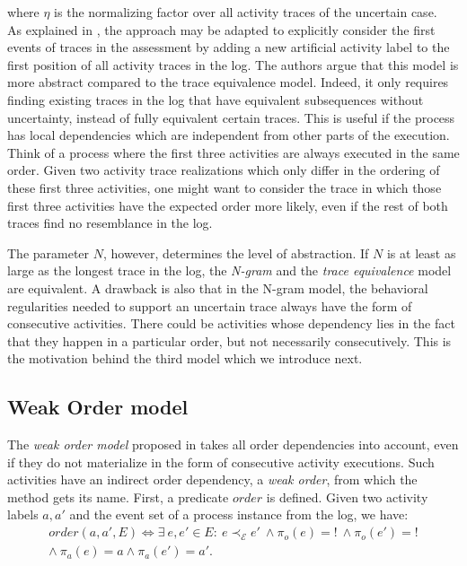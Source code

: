 where $\eta$ is the normalizing factor over all activity traces of the uncertain case.\\
As explained in \cite{por}, the approach may be adapted to explicitly consider the first events of traces in the assessment by adding a new artificial activity label to the first position of all activity traces in the log.
The authors argue that this model is more abstract compared to the trace equivalence model.
Indeed, it only requires finding existing traces in the log that have equivalent subsequences without uncertainty, instead of fully equivalent certain traces.
This is useful if the process has local dependencies which are independent from other parts of the execution.
Think of a process where the first three activities are always executed in the same order.
Given two activity trace realizations which only differ in the ordering of these first three activities, one might want to consider the trace in which those first three activities have the expected order more likely, even if the rest of both traces find no resemblance in the log.

The parameter $N$, however, determines the level of abstraction.
If $N$ is at least as large as the longest trace in the log, the \textit{N-gram} and the \textit{trace equivalence} model are equivalent.
A drawback is also that in the N-gram model, the behavioral regularities needed to support an uncertain trace always have the form of consecutive activities.
There could be activities whose dependency lies in the fact that they happen in a particular order, but not necessarily consecutively.
This is the motivation behind the third model which we introduce next.



\subsection{Weak Order model}
The \textit{weak order model} proposed in \cite{por} takes all order dependencies into account, even if they do not materialize in the form of consecutive activity executions.
Such activities have an indirect order dependency, a \textit{weak order}, from which the method gets its name.
First, a predicate $order$ is defined.
Given two activity labels $a,a'$ and the event set of a process instance from the log, we have:
\begin{align*}
order(a,a',E) \Leftrightarrow 
\exists ~e, e' \in E: ~ e \prec_{\mathcal{E}} e' ~ \wedge \pi_o(e)=! ~ \wedge \pi_o(e')=! \\
\wedge ~ \pi_a(e)=a \wedge \pi_a(e')=a'.
\end{align*}

